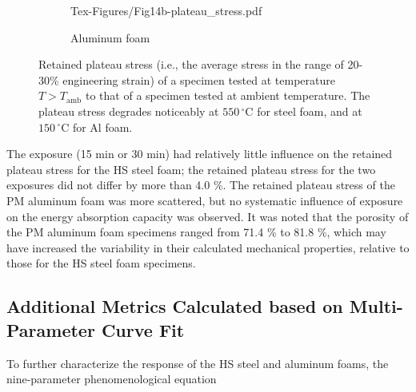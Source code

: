 \documentclass[review]{elsarticle}
\begin{document}
{\begin{figure}
\begin{subfigure}{.5\textwidth}
		{Tex-Figures/Fig14b-plateau_stress.pdf}
		\caption{Aluminum foam}
		\label{fig3:sub2}
	\end{subfigure}
	\caption{Retained plateau stress (i.e., the average stress in the range of 20-30\% engineering strain) of a specimen tested at temperature $T>T_\text{amb}$ to that of a specimen tested at ambient temperature. The plateau stress degrades noticeably at $550\,^{\circ}\mathrm{C}$ for steel foam, and at $150\,^{\circ}\mathrm{C}$ for Al foam.}
	\label{Plateu_stress}
\end{figure}

The exposure (15 min or 30 min) had relatively little influence on the retained plateau stress for the HS steel foam; the retained plateau stress for the two exposures did not differ by more than 4.0 \%. The retained plateau stress of the PM aluminum foam was more scattered, but no systematic influence of exposure on the energy absorption capacity was observed. It was noted that the porosity of the PM aluminum foam specimens ranged from 71.4 \% to 81.8 \%, which may have increased the variability in their calculated mechanical properties, relative to those for the HS steel foam specimens.

\subsection{Additional Metrics Calculated based on Multi-Parameter Curve Fit}

To further characterize the response of the HS steel and aluminum foams, the nine-parameter phenomenological equation

}
\end{document}
